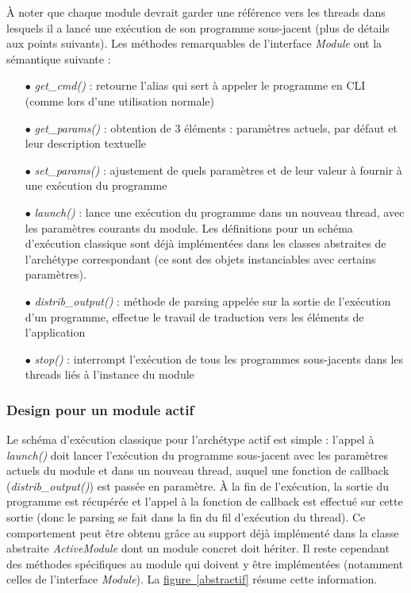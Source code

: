 \documentclass[]{article}
\newcommand{\wordlink}[2]{\hyperref[#1]{#2~\ref{#1}}}
\begin{document}
\newpage

À noter que chaque module devrait garder une référence vers les threads dans lesquels il a lancé une exécution de son programme sous-jacent (plus de détails aux points suivants).
Les méthodes remarquables de l'interface \textit{Module} ont la sémantique suivante :
\vspace{0.1cm}
\begin{itemize}
\item[$\bullet$] \textit{get\_cmd()} : retourne l'alias qui sert à appeler le programme en CLI (comme lors d'une utilisation normale)
\item[$\bullet$] \textit{get\_params()} : obtention de 3 éléments : paramètres actuels, par défaut et leur description textuelle  
\item[$\bullet$] \textit{set\_params()} : ajustement de quels paramètres et de leur valeur à fournir à une exécution du programme
\vspace{0.2cm}
\item[$\bullet$] \textit{launch()} : lance une exécution du programme dans un nouveau thread, avec les paramètres courants du module. Les définitions pour un schéma d'exécution classique sont déjà implémentées dans les classes abstraites de l'archétype correspondant (ce sont des objets instanciables avec certains paramètres).
\vspace{0.1cm}
\item[$\bullet$] \textit{distrib\_output()} : méthode de parsing appelée sur la sortie de l'exécution d'un programme, effectue le travail de traduction vers les éléments de l'application
\vspace{0.1cm}
\item[$\bullet$] \textit{stop()} : interrompt l'exécution de tous les programmes sous-jacents dans les threads liés à l'instance du module
\end{itemize}
    
\subsubsection{Design pour un module actif}

Le schéma d'exécution classique pour l'archétype actif est simple : l'appel à \textit{launch()} doit lancer l'exécution du programme sous-jacent avec les paramètres actuels du module et dans un nouveau thread, auquel une fonction de callback (\textit{distrib\_output()}) est passée en paramètre. À la fin de l'exécution, la sortie du programme est récupérée et l'appel à la fonction de callback est effectué sur cette sortie (donc le parsing se fait dans la fin du fil d'exécution du thread). Ce comportement peut être obtenu grâce au support déjà implémenté dans la classe abstraite \textit{ActiveModule} dont un module concret doit hériter. Il reste cependant des méthodes spécifiques au module qui doivent y être implémentées (notamment celles de l'interface \textit{Module}). La \wordlink{abstractif}{figure} résume cette information.
\end{document}
